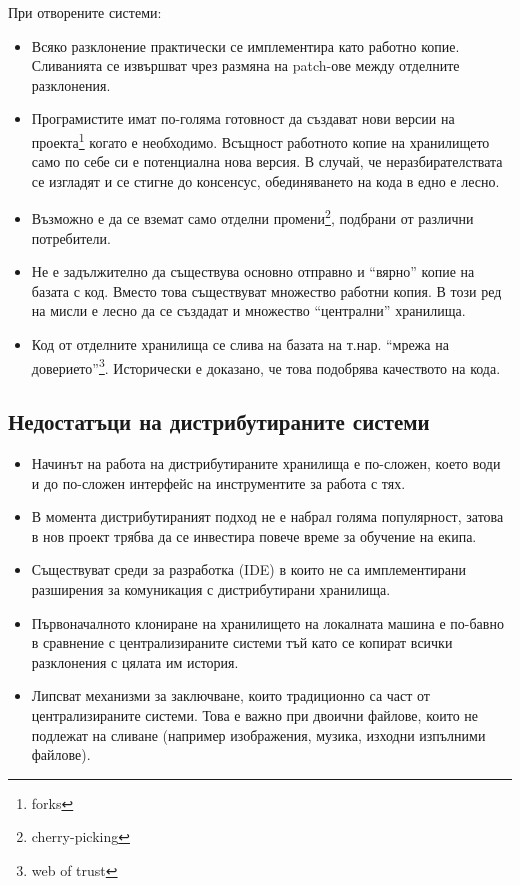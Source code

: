 \documentclass[a4paper]{article}
\begin{document}
      При отворените системи:
      \begin{itemize}
        \item Всяко разклонение практически се имплементира като работно копие. Сливанията се извършват чрез размяна на patch-ове между отделните разклонения.
        \item Програмистите имат по-голяма готовност да създават нови версии на проекта\footnote{forks} когато е необходимо. Всъщност работното копие на хранилището само по себе си е потенциална нова версия. В случай, че неразбирателствата се изгладят и се стигне до консенсус, обединяването на кода в едно е лесно.
        \item Възможно е да се вземат само отделни промени\footnote{cherry-picking}, подбрани от различни потребители.
        \item Не е задължително да съществува основно отправно и ``вярно'' копие на базата с код. Вместо това съществуват множество работни копия. В този ред на мисли е лесно да се създадат и множество ``централни'' хранилища.
        \item Код от отделните хранилища се слива на базата на т.нар. ``мрежа на доверието''\footnote{web of trust}. Исторически е доказано, че това подобрява качеството на кода.
      \end{itemize}

  \subsection{Недостатъци на дистрибутираните системи}
    \begin{itemize}
      \item Начинът на работа на дистрибутираните хранилища е по-сложен, което
      води и до по-сложен интерфейс на инструментите за работа с тях.
      \item В момента дистрибутираният подход не е набрал голяма популярност,
      затова в нов проект трябва да се инвестира повече време за обучение на
      екипа.
      \item Съществуват среди за разработка (IDE) в които не са
      имплементирани разширения за комуникация с дистрибутирани хранилища.
      \item Първоначалното клониране на хранилището на локалната машина
      е по-бавно в сравнение с централизираните системи тъй като се копират
      всички разклонения с цялата им история.
      \item Липсват механизми за заключване, които традиционно са част от
      централизираните системи. Това е важно при двоични файлове, които не
      подлежат на сливане (например изображения, музика, изходни изпълними
      файлове).
    \end{itemize}
\end{document}
